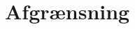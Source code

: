 \documentclass[Rapport/Rapport_main.tex]{subfiles}
\begin{document}
\section{Afgrænsning}
\end{document}

